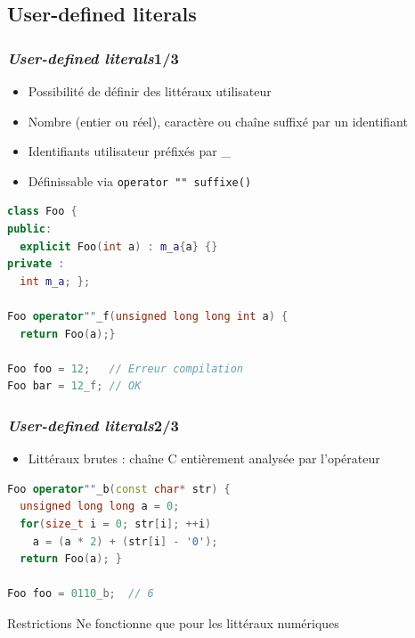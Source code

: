 \documentclass[C++.tex]{subfiles}
\begin{document}
\subsection*{User-defined literals}
\begin{frame}[fragile]
	\frametitle{\textit{User-defined literals}\titlehfill{}1/3}
	\begin{itemize}
		\item Possibilité de définir des littéraux \og utilisateur\fg{}
		\item Nombre (entier ou réel), caractère ou chaîne suffixé par un identifiant
		\item Identifiants \og utilisateur\fg{} préfixés par \_


		\item Définissable via \lstinline|operator "" suffixe()|
	\end{itemize}

	\begin{lstlisting}[language=C++]
class Foo {
public:
  explicit Foo(int a) : m_a{a} {}
private :
  int m_a; };

Foo operator""_f(unsigned long long int a) {
  return Foo(a);}

Foo foo = 12;   // Erreur compilation
Foo bar = 12_f; // OK\end{lstlisting}

\end{frame}

\begin{frame}[fragile]
	\frametitle{\textit{User-defined literals}\titlehfill{}2/3}
	\begin{itemize}
		\item Littéraux brutes : chaîne C entièrement analysée par l'opérateur
	\end{itemize}
	
\begin{lstlisting}[language=C++]
Foo operator""_b(const char* str) {
  unsigned long long a = 0;
  for(size_t i = 0; str[i]; ++i)
    a = (a * 2) + (str[i] - '0');
  return Foo(a); }
		
Foo foo = 0110_b;  // 6\end{lstlisting}

	\begin{alertblock}{Restrictions}
		Ne fonctionne que pour les littéraux numériques
	\end{alertblock}
\end{frame}
\end{document}
